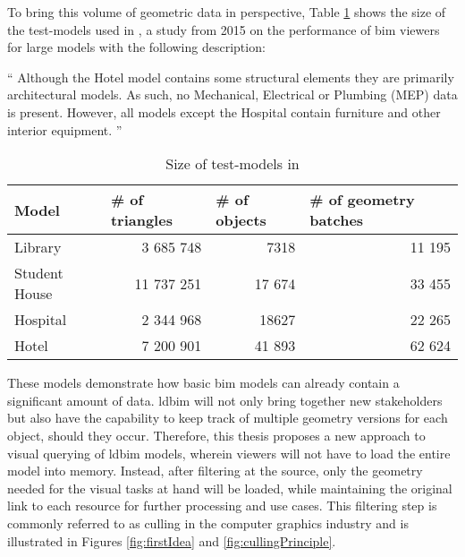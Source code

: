 To bring this volume of geometric data in perspective, Table \ref{tab:sizeModels} shows the size of the test-models used in \cite{Johansson2015} , a study from 2015 on the performance of \ac{bim} viewers for large models with the following description:

\enquote{
	Although the Hotel model contains some structural elements they are primarily architectural models. As such, no Mechanical, Electrical or Plumbing (MEP) data is present. However, all models except the Hospital contain furniture and other interior equipment.
} \parencite{Johansson2015}

\begin{table}[h]
	\centering
	\begin{tabular}{@{}lrrr@{}}
		\toprule
		Model         & \multicolumn{1}{l}{\# of  triangles} & \multicolumn{1}{l}{\# of objects} & \multicolumn{1}{l}{\# of geometry batches} \\ \midrule
		Library       & 3 685 748                            & 7318                              & 11 195                                     \\
		Student House & 11 737 251                           & 17 674                            & 33 455                                     \\
		Hospital      & 2 344 968                            & 18627                             & 22 265                                     \\
		Hotel         & 7 200 901                            & 41 893                            & 62 624                                     \\ \bottomrule
	\end{tabular}
	\caption{Size of test-models in \cite{Johansson2015}}
	\label{tab:sizeModels}
\end{table}

These models demonstrate how basic \ac{bim} models can already contain a significant amount of data. \ac{ldbim} will not only bring together new stakeholders but also have the capability to keep track of multiple geometry versions for each object, should they occur. Therefore, this thesis proposes a new approach to visual querying of \ac{ldbim} models, wherein viewers will not have to load the entire model into memory. Instead, after filtering at the source, only the geometry needed for the visual tasks at hand will be loaded, while maintaining the original link to each resource for further processing and use cases. This filtering step is commonly referred to as culling in the computer graphics industry and is illustrated in Figures \ref{fig:firstIdea} and \ref{fig:cullingPrinciple}.

